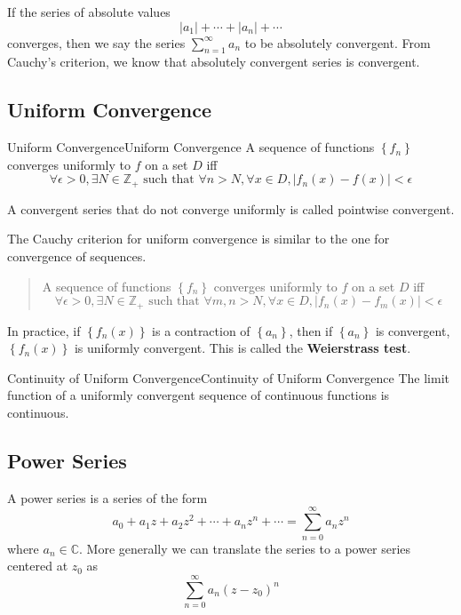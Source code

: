 \documentclass[../main.tex]{subfiles}
\begin{document}
If the series of absolute values
\begin{equation}
\left|a_1\right| + \cdots + \left|a_n\right| + \cdots
\end{equation}
converges, then we say the series $\sum_{n=1}^{\infty } a_n$ to be absolutely convergent. From Cauchy's criterion, we know that absolutely convergent series is convergent.

\subsection{Uniform Convergence}
\begin{definition}{Uniform Convergence}{Uniform Convergence}
	A sequence of functions $\left\{ f_n \right\}$ converges uniformly to $f$ on a set $D$ iff
	\begin{equation*}
		\forall \epsilon>0, \exists N\in \mathbb{Z}_+ \text{ such that } \forall n>N, \forall x\in D, \left|f_n(x)-f(x)\right|<\epsilon
	\end{equation*}

	A convergent series that do not converge uniformly is called pointwise convergent.
\end{definition}

The Cauchy criterion for uniform convergence is similar to the one for convergence of sequences.

\begin{quote}
	A sequence of functions $\left\{ f_n \right\}$ converges uniformly to $f$ on a set $D$ iff
	\begin{equation*}
		\forall \epsilon>0, \exists N\in \mathbb{Z}_+ \text{ such that } \forall m,n>N, \forall x\in D, \left|f_n(x)-f_m(x)\right|<\epsilon
	\end{equation*}
\end{quote}

In practice, if $\left\{ f_n(x) \right\}$ is a contraction of $\left\{ a_n \right\}$, then if $\left\{ a_n \right\}$ is convergent, $\left\{ f_n(x) \right\}$ is uniformly convergent. This is called the \textbf{Weierstrass test}.

\begin{theorem}{Continuity of Uniform Convergence}{Continuity of Uniform Convergence}
The limit function of a uniformly convergent sequence of continuous functions is continuous.
\end{theorem}

\subsection{Power Series}
A power series is a series of the form
\begin{equation*}
	a_0 + a_1 z + a_2 z^2 + \cdots + a_n z^n + \cdots = \sum_{n=0}^{\infty } a_n z^n
\end{equation*}
where $a_n\in \mathbb{C}$. More generally we can translate the series to a power series centered at $z_0$ as
\begin{equation*}
	\sum_{n=0}^{\infty } a_n (z-z_0)^n
\end{equation*}
\end{document}
